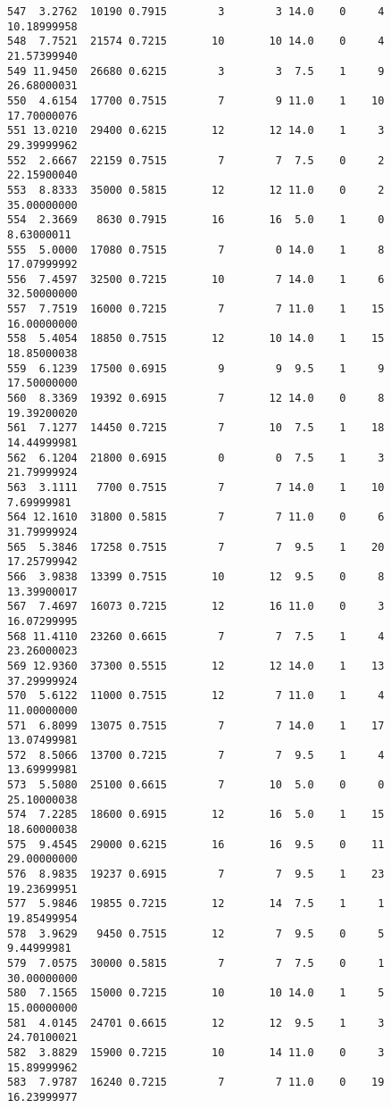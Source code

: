 \documentclass[
  letterpaper,
  DIV=11,
  numbers=noendperiod]{scrreprt}
\begin{document}
\begin{verbatim}
547  3.2762  10190 0.7915        3        3 14.0    0     4 10.18999958
548  7.7521  21574 0.7215       10       10 14.0    0     4 21.57399940
549 11.9450  26680 0.6215        3        3  7.5    1     9 26.68000031
550  4.6154  17700 0.7515        7        9 11.0    1    10 17.70000076
551 13.0210  29400 0.6215       12       12 14.0    1     3 29.39999962
552  2.6667  22159 0.7515        7        7  7.5    0     2 22.15900040
553  8.8333  35000 0.5815       12       12 11.0    0     2 35.00000000
554  2.3669   8630 0.7915       16       16  5.0    1     0  8.63000011
555  5.0000  17080 0.7515        7        0 14.0    1     8 17.07999992
556  7.4597  32500 0.7215       10        7 14.0    1     6 32.50000000
557  7.7519  16000 0.7215        7        7 11.0    1    15 16.00000000
558  5.4054  18850 0.7515       12       10 14.0    1    15 18.85000038
559  6.1239  17500 0.6915        9        9  9.5    1     9 17.50000000
560  8.3369  19392 0.6915        7       12 14.0    0     8 19.39200020
561  7.1277  14450 0.7215        7       10  7.5    1    18 14.44999981
562  6.1204  21800 0.6915        0        0  7.5    1     3 21.79999924
563  3.1111   7700 0.7515        7        7 14.0    1    10  7.69999981
564 12.1610  31800 0.5815        7        7 11.0    0     6 31.79999924
565  5.3846  17258 0.7515        7        7  9.5    1    20 17.25799942
566  3.9838  13399 0.7515       10       12  9.5    0     8 13.39900017
567  7.4697  16073 0.7215       12       16 11.0    0     3 16.07299995
568 11.4110  23260 0.6615        7        7  7.5    1     4 23.26000023
569 12.9360  37300 0.5515       12       12 14.0    1    13 37.29999924
570  5.6122  11000 0.7515       12        7 11.0    1     4 11.00000000
571  6.8099  13075 0.7515        7        7 14.0    1    17 13.07499981
572  8.5066  13700 0.7215        7        7  9.5    1     4 13.69999981
573  5.5080  25100 0.6615        7       10  5.0    0     0 25.10000038
574  7.2285  18600 0.6915       12       16  5.0    1    15 18.60000038
575  9.4545  29000 0.6215       16       16  9.5    0    11 29.00000000
576  8.9835  19237 0.6915        7        7  9.5    1    23 19.23699951
577  5.9846  19855 0.7215       12       14  7.5    1     1 19.85499954
578  3.9629   9450 0.7515       12        7  9.5    0     5  9.44999981
579  7.0575  30000 0.5815        7        7  7.5    0     1 30.00000000
580  7.1565  15000 0.7215       10       10 14.0    1     5 15.00000000
581  4.0145  24701 0.6615       12       12  9.5    1     3 24.70100021
582  3.8829  15900 0.7215       10       14 11.0    0     3 15.89999962
583  7.9787  16240 0.7215        7        7 11.0    0    19 16.23999977

\end{verbatim}
\end{document}
